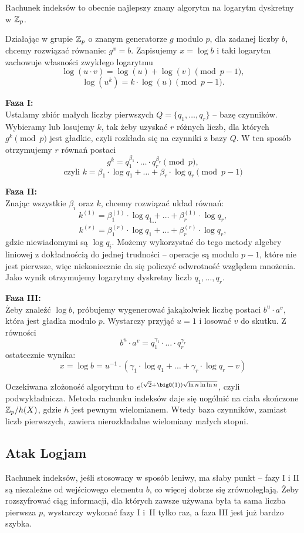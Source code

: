 Rachunek indeksów to obecnie najlepszy znany algorytm na logarytm dyskretny w \( \mathbb{Z}_p \).

Działając w grupie \( \mathbb{Z}_p \) o znanym generatorze \( g \) modulo \( p \), dla zadanej liczby \( b \), chcemy rozwiązać równanie: \( g^x = b \).
Zapisujemy \( x = \log b \) i taki logarytm zachowuje własności zwykłego logarytmu
\[
    \log(u \cdot v) = \log(u) + \log(v) \pmod{p-1},
\]
\[
    \log(u^k) = k \cdot \log(u) \pmod{p-1}.
\]

\textbf{Faza I:} \\
Ustalamy zbiór małych liczby pierwszych \( Q = \{q_1, \dots, q_r\} \) -- bazę czynników.
Wybieramy lub losujemy \( k \), tak żeby uzyskać \( r \) różnych liczb, dla których \( g^k \pmod{p} \) jest gładkie, czyli rozkłada się na czynniki z bazy \( Q \). W ten sposób otrzymujemy \( r \) równań postaci
\[
    g^k = q_1^{\beta_1} \cdot \ldots \cdot q_r^{\beta_r} \pmod{p},
\]
\[
    \text{czyli } k = \beta_1 \cdot \log q_1 + \ldots + \beta_r \cdot \log q_r \pmod{p - 1}
\]

\textbf{Faza II:} \\
Znając wszystkie \( \beta_i \) oraz \( k \), chcemy rozwiązać układ równań:
\[
    k^{(1)} = \beta_1^{(1)} \cdot \log q_1 + \ldots + \beta_r^{(1)} \cdot \log q_r,
\]
\[
    \cdots
\]
\[
    k^{(r)} = \beta_1^{(r)} \cdot \log q_1 + \ldots + \beta_r^{(r)} \cdot \log q_r,
\]
gdzie niewiadomymi są \( \log q_i \). Możemy wykorzystać do tego metody algebry liniowej z dokładnością do jednej trudności -- operacje są modulo \( p-1 \), które nie jest pierwsze, więc niekoniecznie da się policzyć odwrotność względem mnożenia.
Jako wynik otrzymujemy logarytmy dyskretny liczb \( q_1, \dots, q_r \).

\textbf{Faza III:} \\
Żeby znaleźć \( \log b \), próbujemy wygenerować jakąkolwiek liczbę postaci \( b^u \cdot a^v \), która jest gładka modulo \( p \). Wystarczy przyjąć \( u = 1 \) i losować \( v \) do skutku. Z równości
\[ b^u \cdot a^v = q_1^{\gamma_1} \cdot \ldots \cdot q_r^{\gamma_r} \]
ostatecznie wynika:
\[ x = \log b = u^{-1} \cdot (\gamma_1 \cdot \log q_1 + \ldots + \gamma_r \cdot \log q_r - v) \]

Oczekiwana złożoność algorytmu to \( e^{(\sqrt{2}+\bigO(1))\sqrt{\ln n \ln\ln n}} \), czyli podwykładnicza. Metoda rachunku indeksów daje się uogólnić na ciała skończone \( \mathbb{Z}_p/h(X) \), gdzie \( h \) jest pewnym wielomianem. Wtedy baza czynników, zamiast liczb pierwszych, zawiera nierozkładalne wielomiany małych stopni.

\subsection{Atak Logjam}
Rachunek indeksów, jeśli stosowany w sposób leniwy, ma słaby punkt -- fazy I i II są niezależne od wejściowego elementu \( b \), co więcej dobrze się zrównoleglają.
Żeby rozszyfrować ciąg informacji, dla których zawsze używana była ta sama liczba pierwsza \( p \), wystarczy wykonać fazy I i~II tylko raz, a faza III jest już bardzo szybka.